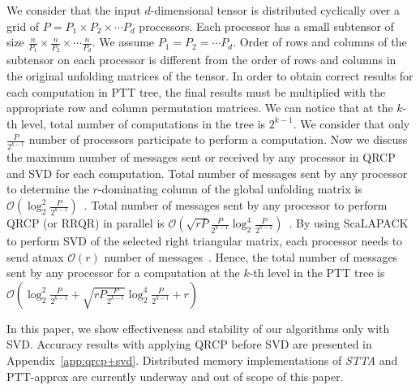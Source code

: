 \documentclass[sigconf]{acmart}
\newcommand{\otta}{{\it STTA}\xspace}
\begin{document}
We consider that the input $d$-dimensional tensor is distributed cyclically over a grid of $P = P_1 \times P_2\times\cdots P_d$ processors. Each processor has a small subtensor of size $\frac{n}{P_1}\times \frac{n}{P_2} \times \cdots \frac{n}{P_d}$. We assume $P_1=P_2=\cdots P_d$. Order of rows and columns of the subtensor on each processor is different from the order of rows and columns in the original unfolding matrices of the tensor. In order to obtain correct results for each computation in PTT tree, the final results must be multiplied with the appropriate row and column permutation matrices. We can notice that at the $k$-th level, total number of computations in the tree is $2^{k-1}$. We consider that only $\frac{P}{2^{k-1}}$ number of processors participate to perform a computation. Now we discuss the maximum number of messages sent or received by any processor in QRCP and SVD for each computation. Total number of messages sent by any processor to determine the $r$-dominating column of the global unfolding matrix is $\mathcal{O}(\log_2^2 \frac{P}{2^{k-1}})$~\cite{beaupere-tournamentpivoting}. Total number of messages sent by any processor to perform QRCP (or RRQR) in parallel is $\mathcal{O}(\sqrt{rP}\frac{P}{2^{k-1}} \log_2^4\frac{P}{2^{k-1}})$~\cite{carrqr-2015}. By using ScaLAPACK to perform SVD of the selected right triangular matrix, each processor needs to send atmax $\mathcal{O}(r)$ number of messages~\cite{Ballard-mcnla-2011}. Hence, the total number of messages sent by any processor for a computation at the $k$-th level in the PTT tree is $\mathcal{O}(\log_2^2 \frac{P}{2^{k-1}} + \sqrt{rP\frac{P}{2^{k-1}}} \log_2^4\frac{P}{2^{k-1}} + r)$


In this paper, we show effectiveness and stability of our algorithms only with SVD. Accuracy results with applying QRCP before SVD are presented in Appendix~\ref{app:qrcp+svd}. Distributed memory implementations of \otta and PTT-approx are currently underway and out of scope of this paper.



\end{document}
